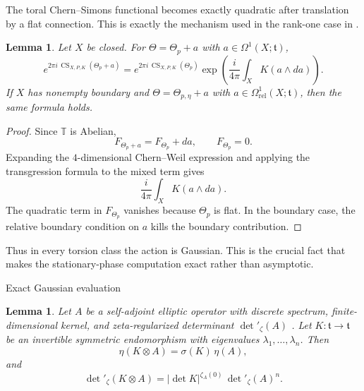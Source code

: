 \documentclass[12pt]{amsart}
\makeatletter
\renewcommand\subsection{\@startsection{subsection}{2}%
  \z@{.5\linespacing\@plus.7\linespacing}{-.5em}%
  {\normalfont\bfseries}}
\numberwithin{equation}{section}
\newtheorem{lemma}[theorem]{Lemma}
\makeatother
\begin{document}
The toral Chern--Simons functional becomes exactly quadratic after translation by a flat
connection. This is exactly the mechanism used in the rank-one case in \cite{Manoliu3}.

\begin{lemma}
\label{lem:quadratic-reduction-toral}
Let \(X\) be closed. For \(\Theta=\Theta_p+a\) with \(a\in \Omega^1(X;\mathfrak t)\),
\begin{equation}
\label{eq:quadratic-reduction-toral}
e^{2\pi i\,\operatorname{CS}_{X,P,K}(\Theta_p+a)}
=
e^{2\pi i\,\operatorname{CS}_{X,P,K}(\Theta_p)}
\exp\!\left(
\frac{i}{4\pi}\int_X K(a\wedge da)
\right).
\end{equation}
If \(X\) has nonempty boundary and \(\Theta=\Theta_{p,\eta}+a\) with
\(a\in \Omega^1_{\mathrm{rel}}(X;\mathfrak t)\), then the same formula holds.
\end{lemma}

\begin{proof}
Since \(\mathbb T\) is Abelian,
\[
F_{\Theta_p+a}=F_{\Theta_p}+da,
\qquad
F_{\Theta_p}=0.
\]
Expanding the \(4\)-dimensional Chern--Weil expression and applying the transgression formula to the mixed term
gives
\[
\frac{i}{4\pi}\int_X K(a\wedge da).
\]
The quadratic term in \(F_{\Theta_p}\) vanishes because \(\Theta_p\) is flat. In the boundary
case, the relative boundary condition on \(a\) kills the boundary contribution.
\end{proof}

Thus in every torsion class the action is Gaussian. This is the crucial fact that makes the
stationary-phase computation exact rather than asymptotic.


\subsection{Exact Gaussian evaluation}


\begin{lemma}\label{lem:spectral-factorization-toral}
Let \(A\) be a self-adjoint elliptic operator with discrete spectrum, finite-dimensional kernel,
and zeta-regularized determinant \(\det\nolimits'_\zeta(A)\) \cite{Ray1971}. Let
\(K\colon \mathfrak t\to \mathfrak t\) be an invertible symmetric endomorphism with eigenvalues
\(\lambda_1,\dots,\lambda_n\). Then
\[
\eta(K\otimes A)=\sigma(K)\,\eta(A),
\]
and
\[
\det\nolimits'_\zeta(K\otimes A)
=
|\det K|^{\zeta_A(0)}\,\det\nolimits'_\zeta(A)^n.
\]
\end{lemma}
\end{document}
